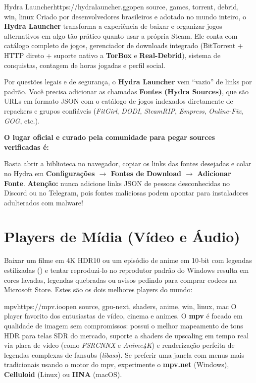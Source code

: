 \documentclass{pousadaguide}
\begin{document}
\begin{ferramenta}[goat,logo=hydra]{Hydra Launcher}{https://hydralauncher.gg}{open source, games, torrent, debrid, win, linux}
Criado por desenvolvedores brasileiros e adotado no mundo inteiro, o \textbf{Hydra Launcher} transforma a experiência de baixar e organizar jogos alternativos em algo tão prático quanto usar a própria Steam. Ele conta com catálogo completo de jogos, gerenciador de downloads integrado (BitTorrent + HTTP direto + suporte nativo a \textbf{TorBox} e \textbf{Real-Debrid}), sistema de conquistas, contagem de horas jogadas e perfil social. 
\end{ferramenta}

\begin{pousadinha}
Por questões legais e de segurança, o \textbf{Hydra Launcher} vem ``vazio'' de links por padrão. Você precisa adicionar as chamadas \textbf{Fontes (Hydra Sources)}, que são URLs em formato JSON com o catálogo de jogos indexados diretamente de repackers e grupos confiáveis (\emph{FitGirl}, \emph{DODI}, \emph{SteamRIP}, \emph{Empress}, \emph{Online-Fix}, \emph{GOG}, etc.).

\textbf{O lugar oficial e curado pela comunidade para pegar sources verificadas é:}
\begin{center}
\end{center}

Basta abrir a biblioteca no navegador, copiar os links das fontes desejadas e colar no Hydra em \textbf{Configurações $\rightarrow$ Fontes de Download $\rightarrow$ Adicionar Fonte}. \textbf{Atenção:} nunca adicione links JSON de pessoas desconhecidas no Discord ou no Telegram, pois fontes maliciosas podem apontar para instaladores adulterados com malware!
\end{pousadinha}

\section{Players de Mídia (Vídeo e Áudio)}

Baixar um filme em 4K HDR10 ou um episódio de anime em 10-bit com legendas estilizadas () e tentar reproduzi-lo no reprodutor padrão do Windows resulta em cores lavadas, legendas quebradas ou avisos pedindo para comprar codecs na Microsoft Store. Estes são os dois melhores players do mundo:

\begin{ferramenta}[goat,logo=mpv]{mpv}{https://mpv.io}{open source, gpu-next, shaders, anime, win, linux, mac}
O player favorito dos entusiastas de vídeo, cinema e animes. O \textbf{mpv} é focado em qualidade de imagem sem compromissos: possui o melhor mapeamento de tons HDR para telas SDR do mercado, suporte a shaders de upscaling em tempo real via placa de vídeo (como \emph{FSRCNNX} e \emph{Anime4K}) e renderização perfeita de legendas complexas de fansubs (\emph{libass}). Se preferir uma janela com menus mais tradicionais usando o motor do mpv, experimente o \textbf{mpv.net} (Windows), \textbf{Celluloid} (Linux) ou \textbf{IINA} (macOS). 
\end{ferramenta}
\end{document}
